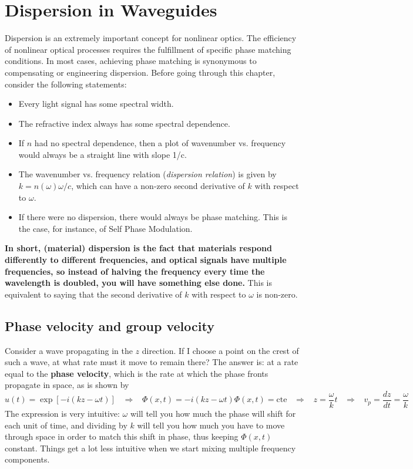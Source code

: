 \hrulefill
\newpage
\section{Dispersion in Waveguides}

\noindent Dispersion is an extremely important concept for nonlinear optics. The efficiency of nonlinear optical processes requires the fulfillment of specific phase matching conditions. In most cases, achieving phase matching is synonymous to compensating or engineering dispersion. Before going through this chapter, consider the following statements:
\begin{itemize}
    \item Every light signal has some spectral width.
    \item The refractive index always has some spectral dependence.
    \item If $n$ had no spectral dependence, then a plot of wavenumber vs. frequency would always be a straight line with slope 1/c.
    \item The wavenumber vs. frequency relation (\textit{dispersion relation}) is given by $k=n(\omega)\omega/c$, which can have a non-zero second derivative of $k$ with respect to $\omega$.
    \item If there were no dispersion, there would always be phase matching. This is the case, for instance, of Self Phase Modulation.
\end{itemize}
%
\textbf{In short, (material) dispersion is the fact that materials respond differently to different frequencies, and optical signals have multiple frequencies, so instead of halving the frequency every time the wavelength is doubled, you will have something else done. }This is equivalent to saying that the second derivative of $k$ with respect to $\omega$ is non-zero.

\subsection{Phase velocity and group velocity}

Consider a wave propagating in the $z$ direction. If I choose a point on the crest of such a wave, at what rate must it move to remain there? The answer is: at a rate equal to the \textbf{phase velocity}, which is the rate at which the phase fronts propagate in space, as is shown by
\begin{subequations}
\begin{equation}
    u(t)=\exp\left[-i(kz-\omega t)\right]\;\;\;\Rightarrow\;\;\;\Phi(x,t)=-i(kz-\omega t)
\end{equation}
\begin{equation}
    \Phi(x,t)=\text{cte}\;\;\;\Rightarrow\;\;\;z=\frac{\omega}{k}t\;\;\;\Rightarrow\;\;\;\boxed{v_p=\frac{dz}{dt}=\frac{\omega}{k}}
\end{equation}
\end{subequations}
The expression is very intuitive: $\omega$ will tell you how much the phase will shift for each unit of time, and dividing by $k$ will tell you how much you have to move through space in order to match this shift in phase, thus keeping $\Phi(x,t)$ constant. Things get a lot less intuitive when we start mixing multiple frequency components.

